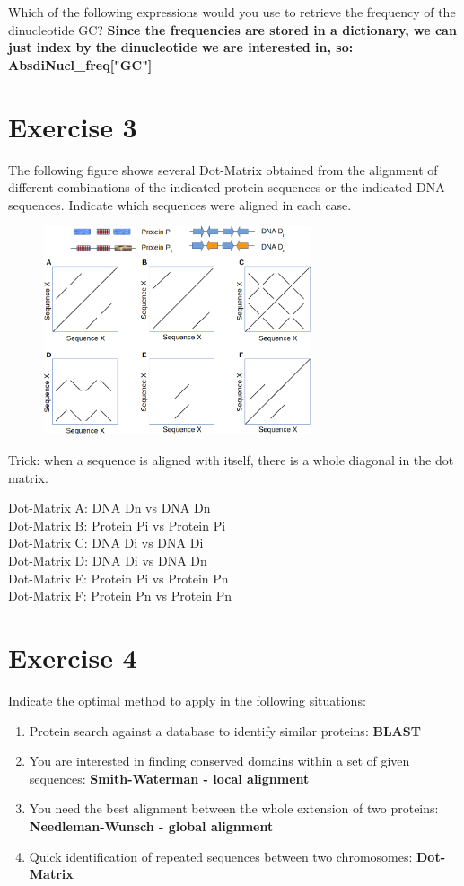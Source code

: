 Which of the following expressions would you use to retrieve the frequency of the dinucleotide GC? \textbf{Since the frequencies are stored in a dictionary, we can just index by the dinucleotide we are interested in, so: AbsdiNucl\_freq["GC"]}

\section{Exercise 3}
The following figure shows several Dot-Matrix obtained from the alignment of different combinations of the indicated protein sequences or the indicated DNA sequences. Indicate which sequences were aligned in each case.
\begin{figure}[htbp]
\centering
\includegraphics[width = 0.7\textwidth]{figs/exam-ex3.png}
\end{figure}

Trick: when a sequence is aligned with itself, there is a whole diagonal in the dot matrix.

\noindent
Dot-Matrix A: DNA Dn vs DNA Dn \\
Dot-Matrix B: Protein Pi vs Protein Pi \\
Dot-Matrix C: DNA Di vs DNA Di\\
Dot-Matrix D: DNA Di vs DNA Dn \\
Dot-Matrix E: Protein Pi vs Protein Pn \\
Dot-Matrix F: Protein Pn vs Protein Pn \\

\section{Exercise 4}
Indicate the optimal method to apply in the following situations:
\begin{enumerate}
\item Protein search against a database to identify similar proteins: \textbf{BLAST}
\item  You are interested in finding conserved domains within a set of given sequences: \textbf{Smith-Waterman - local alignment}
\item You need the best alignment between the whole extension of two proteins: \textbf{Needleman-Wunsch - global alignment}
\item Quick identification of repeated sequences between two chromosomes: \textbf{Dot-Matrix}
\end{enumerate}

